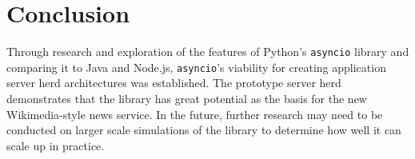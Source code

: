 \section*{Conclusion}
Through research and exploration of the features of Python's \texttt{asyncio} library and comparing it to Java and Node.js, \texttt{asyncio}'s viability for creating application server herd architectures was established. The prototype server herd demonstrates that the library has great potential as the basis for the new Wikimedia-style news service. In the future, further research may need to be conducted on larger scale simulations of the library to determine how well it can scale up in practice.






